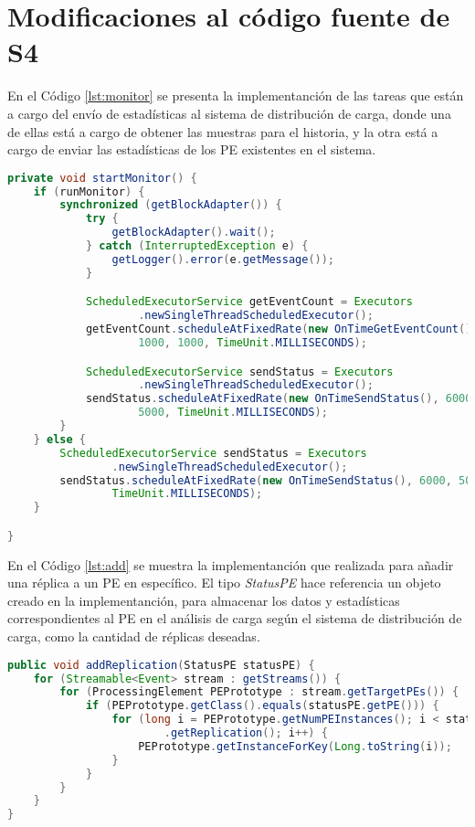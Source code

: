 \chapter{Modificaciones al código fuente de S4}
\label{apendice:codigoFuenteS4}

En el Código \ref{lst:monitor} se presenta la implementanción de las tareas que están a cargo del envío de estadísticas al sistema de distribución de carga, donde una de ellas está a cargo de obtener las muestras para el historia, y la otra está a cargo de enviar las estadísticas de los PE existentes en el sistema.

\begin{lstlisting}[caption={Tareas que ejecutan el sistema de distribución de carga.},label={lst:monitor},language=Java]
private void startMonitor() {
	if (runMonitor) {
		synchronized (getBlockAdapter()) {
			try {
				getBlockAdapter().wait();
			} catch (InterruptedException e) {
				getLogger().error(e.getMessage());
			}

			ScheduledExecutorService getEventCount = Executors
					.newSingleThreadScheduledExecutor();
			getEventCount.scheduleAtFixedRate(new OnTimeGetEventCount(),
					1000, 1000, TimeUnit.MILLISECONDS);

			ScheduledExecutorService sendStatus = Executors
					.newSingleThreadScheduledExecutor();
			sendStatus.scheduleAtFixedRate(new OnTimeSendStatus(), 6000,
					5000, TimeUnit.MILLISECONDS);
		}
	} else {
		ScheduledExecutorService sendStatus = Executors
				.newSingleThreadScheduledExecutor();
		sendStatus.scheduleAtFixedRate(new OnTimeSendStatus(), 6000, 5000,
				TimeUnit.MILLISECONDS);
	}

}
\end{lstlisting}

En el Código \ref{lst:add} se muestra la implementanción que realizada para añadir una réplica a un PE en específico. El tipo \textit{StatusPE} hace referencia un objeto creado en la implementanción, para almacenar los datos y estadísticas correspondientes al PE en el análisis de carga según el sistema de distribución de carga, como la cantidad de réplicas deseadas.

\begin{lstlisting}[caption={Añadir r\'eplicas a un PE en S4.},label={lst:add},language=Java]
public void addReplication(StatusPE statusPE) {
	for (Streamable<Event> stream : getStreams()) {
		for (ProcessingElement PEPrototype : stream.getTargetPEs()) {
			if (PEPrototype.getClass().equals(statusPE.getPE())) {
				for (long i = PEPrototype.getNumPEInstances(); i < statusPE
						.getReplication(); i++) {
					PEPrototype.getInstanceForKey(Long.toString(i));
				}
			}
		}
	}
}
\end{lstlisting}

